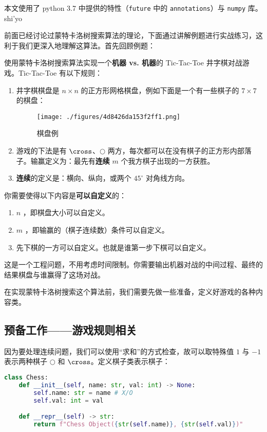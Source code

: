 

本文使用了 python 3.7 中提供的特性（\verb`future` 中的 \verb`annotations`）与 \verb`numpy` 库。shi'yo

前面已经讨论过蒙特卡洛树搜索算法的理论，下面通过讲解例题进行实战练习，这利于我们更深入地理解这算法。首先回顾例题：
\begin{example}{}
使用蒙特卡洛树搜索算法实现一个\textbf{机器 vs. 机器}的 Tic-Tac-Toe 井字棋对战游戏。Tic-Tac-Toe 有以下规则：
\begin{enumerate}
\item 井字棋棋盘是 $n \times n$ 的正方形网格棋盘，例如下面是一个有一些棋子的 $7 \times 7$ 的棋盘：
\begin{figure}[ht]
\centering
\texttt{[image: ./figures/4d8426da153f2ff1.png]}
\caption{棋盘例} \label{fig_MCTSci_2}
\end{figure}
\item 游戏的下法是有 $\cross$、$\bigcirc$ 两方，每次都可以在没有棋子的正方形内部落子。输赢定义为：最先有\textbf{连续} $m$ 个我方棋子出现的一方获胜。
\item \textbf{连续}的定义是：横向、纵向，或两个 $45^\circ$ 对角线方向。
\end{enumerate}

你需要使得以下内容是\textbf{可以自定义}的：
\begin{enumerate}
\item $n$ ，即棋盘大小可以自定义。
\item $m$ ，即输赢的（棋子连续数）条件可以自定义。
\item 先下棋的一方可以自定义。也就是谁第一步下棋可以自定义。
\end{enumerate}

这是一个工程问题，不用考虑时间限制。你需要输出机器对战的中间过程、最终的结果棋盘与谁赢得了这场对战。
\end{example}
在实现蒙特卡洛树搜索这个算法前，我们需要先做一些准备，定义好游戏的各种内容类。
\subsection{预备工作——游戏规则相关}
因为要处理连续问题，我们可以使用“求和”的方式检查，故可以取特殊值 $1$ 与 $-1$ 表示两种棋子 $\bigcirc$ 和 $\cross$。定义棋子类表示棋子：
\begin{lstlisting}[language=python]
class Chess:
    def __init__(self, name: str, val: int) -> None:
        self.name: str = name # X/O
        self.val: int = val

    def __repr__(self) -> str:
        return f"Chess Object({str(self.name)}, {str(self.val)})"
\end{lstlisting}

